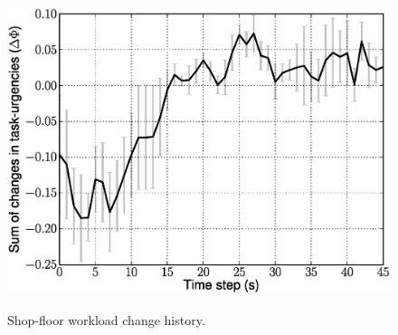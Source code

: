 \documentclass[final,5p,times,twocolumn]{elsarticle}
\begin{document}
\begin{figure}
{\includegraphics[width=0.7\linewidth, angle=0]
{images/SD-TaskUrgencyStat.eps}}
\newline
\caption{Shop-floor workload change history.}
\end{figure}
\end{document}
